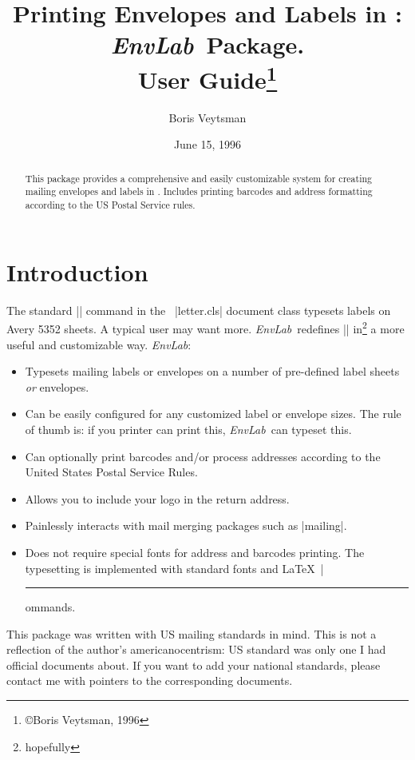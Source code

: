 \documentclass{ltxguide}
\newcommand{\EL}{\textsl{EnvLab}}
\begin{document}
\title{Printing Envelopes and Labels in \LaTeXe: \EL\ Package.\\
User Guide\thanks{\copyright Boris Veytsman, 1996}}
\author{Boris Veytsman}
\date{June 15, 1996}

\maketitle

\begin{abstract}
  This package provides a comprehensive and easily customizable system
  for creating mailing envelopes and labels in \LaTeXe. Includes
  printing barcodes and address formatting according to the US Postal
  Service rules.
\end{abstract}
 
\tableofcontents
\listoffigures
\listoftables




\section{Introduction}
\label{sec:Intro}

The standard |\makelabels| command in the \LaTeXe\ |letter.cls|
document class typesets labels on Avery 5352 sheets. A typical user
may want more. \EL\ redefines |\makelabels| in\footnote{hopefully}
a more useful and customizable way. \EL:
\begin{itemize}
\item Typesets mailing labels or envelopes on a number
  of pre-defined label sheets \emph{or} envelopes.
\item Can be easily configured for any customized label or envelope
  sizes. The rule of thumb is: if you printer can print this, \EL\ can
  typeset this.
\item Can optionally print barcodes and/or process addresses according
  to the United States Postal Service Rules.
\item Allows you to include your logo in the return address.
\item Painlessly interacts with mail merging packages such as
  |mailing|.
\item Does not require special fonts for address and barcodes
  printing.  The typesetting is implemented with standard fonts and
  \LaTeX\ |\rule| commands.
\end{itemize}

This package was written with US mailing standards in mind. This is
not a reflection of the author's americanocentrism: US standard was
only one I had official documents about. If you want to add your
national standards, please contact me with pointers to the
corresponding documents.
\end{document}

